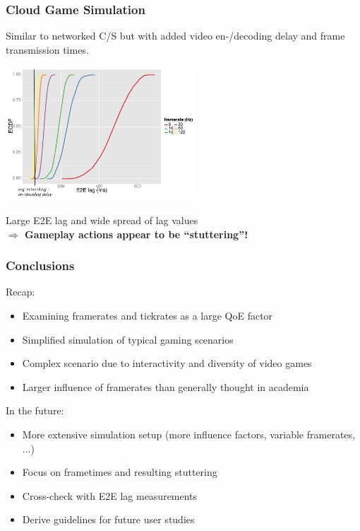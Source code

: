 \documentclass{UDEbeamerEN}
\begin{document}
\begin{frame}
	\frametitle{Cloud Game Simulation}

	\begin{center}
		Similar to networked C/S but with added video en-/decoding delay and frame transmission times.

		\includegraphics[height=5cm]{extras/cloudgaming-lag-cdf.pdf}

		Large E2E lag and wide spread of lag values\\
		\textbf{$\Rightarrow$ Gameplay actions appear to be ``stuttering''!}
	\end{center}
\end{frame}




\begin{frame}
	\frametitle{Conclusions}

	Recap:
	\begin{itemize}
		\item Examining framerates and tickrates as a large QoE factor
		\item Simplified simulation of typical gaming scenarios
		\item Complex scenario due to interactivity and diversity of video games
		\item Larger influence of framerates than generally thought in academia
	\end{itemize}

	\vspace{4mm}

	\pause
	In the future:
	\begin{itemize}
		\item More extensive simulation setup (more influence factors, variable framerates, ...)
		\item Focus on frametimes and resulting stuttering
		\item Cross-check with E2E lag measurements
		\item Derive guidelines for future user studies
	\end{itemize}
\end{frame}
\end{document}
